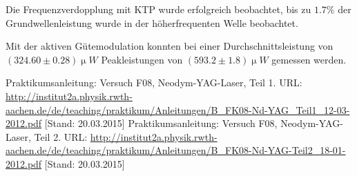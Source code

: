 \documentclass{../Misc/MontavonLaTeX/Montavon}
\begin{document}
Die Frequenzverdopplung mit KTP wurde erfolgreich beobachtet, bis zu $1.7 \unit{\%}$ der Grundwellenleistung wurde in der höherfrequenten Welle beobachtet.

Mit der aktiven Gütemodulation konnten bei einer Durchschnittsleistung von $(324.60 \pm 0.28) \unit{\upmu W}$ Peakleistungen von $(593.2 \pm 1.8) \unit{\upmu W}$ gemessen werden.

\newpage
\begin{thebibliography}{xxxx}
 Praktikumsanleitung:
Versuch F08, Neodym-YAG-Laser, Teil 1. URL: \url{http://institut2a.physik.rwth-aachen.de/de/teaching/praktikum/Anleitungen/B_FK08-Nd-YAG_Teil1_12-03-2012.pdf} [Stand: 20.03.2015]
 Praktikumsanleitung:
Versuch F08, Neodym-YAG-Laser, Teil 2. URL: \url{http://institut2a.physik.rwth-aachen.de/de/teaching/praktikum/Anleitungen/B_FK08-Nd-YAG-Teil2_18-01-2012.pdf} [Stand: 20.03.2015]
\end{thebibliography}
\end{document}
